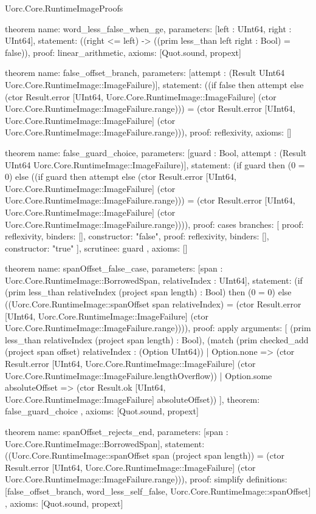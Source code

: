 \begin{lexlean}{Uorc.Core.RuntimeImageProofs}
\begin{semanticmodule}
theorem{
  name: word_less_false_when_ge,
  parameters: [left : UInt64, right : UInt64],
  statement: ((right <= left) -> ((prim less_than left right : Bool) = false)),
  proof: linear_arithmetic{},
  axioms: [Quot.sound, propext]
}

theorem{
  name: false_offset_branch,
  parameters: [attempt : (Result UInt64 Uorc.Core.RuntimeImage::ImageFailure)],
  statement: ((if false then attempt else (ctor Result.error [UInt64, Uorc.Core.RuntimeImage::ImageFailure] (ctor Uorc.Core.RuntimeImage::ImageFailure.range))) = (ctor Result.error [UInt64, Uorc.Core.RuntimeImage::ImageFailure] (ctor Uorc.Core.RuntimeImage::ImageFailure.range))),
  proof: reflexivity{},
  axioms: []
}

theorem{
  name: false_guard_choice,
  parameters: [guard : Bool, attempt : (Result UInt64 Uorc.Core.RuntimeImage::ImageFailure)],
  statement: (if guard then (0 = 0) else ((if guard then attempt else (ctor Result.error [UInt64, Uorc.Core.RuntimeImage::ImageFailure] (ctor Uorc.Core.RuntimeImage::ImageFailure.range))) = (ctor Result.error [UInt64, Uorc.Core.RuntimeImage::ImageFailure] (ctor Uorc.Core.RuntimeImage::ImageFailure.range)))),
  proof: cases{
    branches: [
      {proof: reflexivity{}, binders: [], constructor: "false"},
      {proof: reflexivity{}, binders: [], constructor: "true"}
    ],
    scrutinee: guard
  },
  axioms: []
}

theorem{
  name: spanOffset_false_case,
  parameters: [span : Uorc.Core.RuntimeImage::BorrowedSpan, relativeIndex : UInt64],
  statement: (if (prim less_than relativeIndex (project span length) : Bool) then (0 = 0) else ((Uorc.Core.RuntimeImage::spanOffset span relativeIndex) = (ctor Result.error [UInt64, Uorc.Core.RuntimeImage::ImageFailure] (ctor Uorc.Core.RuntimeImage::ImageFailure.range)))),
  proof: apply{
    arguments: [
      (prim less_than relativeIndex (project span length) : Bool),
      (match (prim checked_add (project span offset) relativeIndex : (Option UInt64))
        | Option.none => (ctor Result.error [UInt64, Uorc.Core.RuntimeImage::ImageFailure] (ctor Uorc.Core.RuntimeImage::ImageFailure.lengthOverflow))
        | Option.some absoluteOffset => (ctor Result.ok [UInt64, Uorc.Core.RuntimeImage::ImageFailure] absoluteOffset))
    ],
    theorem: false_guard_choice
  },
  axioms: [Quot.sound, propext]
}

theorem{
  name: spanOffset_rejects_end,
  parameters: [span : Uorc.Core.RuntimeImage::BorrowedSpan],
  statement: ((Uorc.Core.RuntimeImage::spanOffset span (project span length)) = (ctor Result.error [UInt64, Uorc.Core.RuntimeImage::ImageFailure] (ctor Uorc.Core.RuntimeImage::ImageFailure.range))),
  proof: simplify{
    definitions: [false_offset_branch, word_less_self_false, Uorc.Core.RuntimeImage::spanOffset]
  },
  axioms: [Quot.sound, propext]
}


\end{semanticmodule}
\end{lexlean}
